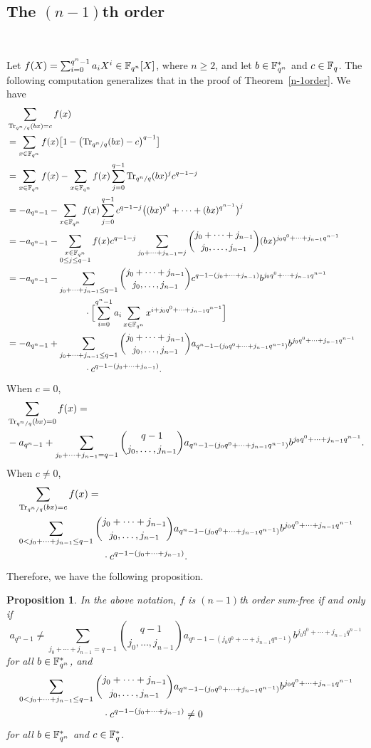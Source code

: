 \documentclass{amsart}
\newtheorem{prop}[thm]{Proposition}
\numberwithin{equation}{section}
\theoremstyle{definition}
\newcommand{\f}{\Bbb F}
\newcommand{\tr}{\text{\rm Tr}}
\begin{document}
\subsection{The $(n-1)$th order}\

Let $f(X)=\sum_{i=0}^{q^n-1}a_iX^i\in\f_{q^n}[X]$, where $n\ge 2$, and let $b\in\f_{q^n}^*$ and $c\in\f_q$. The following computation generalizes that in the proof of Theorem~\ref{n-1order}. We have
\begin{align*}
&\sum_{\tr_{q^n/q}(bx)=c}f(x)\cr
&=\sum_{x\in\f_{q^n}}f(x)\bigl[1-\bigl(\tr_{q^n/q}(bx)-c\bigr)^{q-1}\bigr]\cr
&=\sum_{x\in\f_{q^n}}f(x)-\sum_{x\in\f_{q^n}}f(x)\sum_{j=0}^{q-1}\tr_{q^n/q}(bx)^jc^{q-1-j}\cr
&=-a_{q^n-1}-\sum_{x\in\f_{q^n}}f(x)\sum_{j=0}^{q-1}c^{q-1-j}\bigl((bx)^{q^0}+\cdots+(bx)^{q^{n-1}}\bigr)^j\cr
&=-a_{q^n-1}-\sum_{\substack{x\in\f_{q^n}\cr 0\le j\le q-1}}f(x)c^{q-1-j}\sum_{j_0+\cdots+j_{n-1}=j}\binom{j_0+\cdots+j_{n-1}}{j_0,\dots,j_{n-1}}(bx)^{j_0q^0+\cdots+j_{n-1}q^{n-1}}\cr
&=-a_{q^n-1}-\sum_{j_0+\cdots+j_{n-1}\le q-1}\binom{j_0+\cdots+j_{n-1}}{j_0,\dots,j_{n-1}}c^{q-1-(j_0+\cdots+j_{n-1})}b^{j_0q^0+\cdots+j_{n-1}q^{n-1}}\cr
&\kern 3cm \cdot\Bigl[\sum_{i=0}^{q^n-1}a_i\sum_{x\in\f_{q^n}}x^{i+j_0q^0+\cdots+j_{n-1}q^{n-1}}\Bigr]\cr
&=-a_{q^n-1}+\sum_{j_0+\cdots+j_{n-1}\le q-1}\binom{j_0+\cdots+j_{n-1}}{j_0,\dots,j_{n-1}}a_{q^n-1-(j_0q^0+\cdots+j_{n-1}q^{n-1})}b^{j_0q^0+\cdots+j_{n-1}q^{n-1}}\cr
&\kern 3cm \cdot c^{q-1-(j_0+\cdots+j_{n-1})}.
\end{align*}
When $c=0$,
\begin{align}\label{c=0}
&\sum_{\tr_{q^n/q}(bx)=0}f(x)=\\
&-a_{q^n-1}+\sum_{j_0+\cdots+j_{n-1}=q-1}\binom{q-1}{j_0,\dots,j_{n-1}}a_{q^n-1-(j_0q^0+\cdots+j_{n-1}q^{n-1})}b^{j_0q^0+\cdots+j_{n-1}q^{n-1}}.\nonumber
\end{align}
When $c\ne 0$,
\begin{align}\label{cne0}
&\sum_{\tr_{q^n/q}(bx)=c}f(x)=\\
&\sum_{0<j_0+\cdots+j_{n-1}\le q-1}\binom{j_0+\cdots+j_{n-1}}{j_0,\dots,j_{n-1}}a_{q^n-1-(j_0q^0+\cdots+j_{n-1}q^{n-1})}b^{j_0q^0+\cdots+j_{n-1}q^{n-1}}\cr
&\kern 3cm \cdot c^{q-1-(j_0+\cdots+j_{n-1})}.\nonumber
\end{align}
Therefore, we have the following proposition.
\begin{prop}\label{P4.2}
In the above notation, $f$ is $(n-1)$th order sum-free if and only if 
\begin{equation}\label{cond1}
a_{q^n-1}\ne\sum_{j_0+\cdots+j_{n-1}=q-1}\binom{q-1}{j_0,\dots,j_{n-1}}a_{q^n-1-(j_0q^0+\cdots+j_{n-1}q^{n-1})}b^{j_0q^0+\cdots+j_{n-1}q^{n-1}}
\end{equation}
for all $b\in\f_{q^n}^*$, and 
\begin{align}\label{cond2}
&\sum_{0<j_0+\cdots+j_{n-1}\le q-1}\binom{j_0+\cdots+j_{n-1}}{j_0,\dots,j_{n-1}}a_{q^n-1-(j_0q^0+\cdots+j_{n-1}q^{n-1})}b^{j_0q^0+\cdots+j_{n-1}q^{n-1}}\\
&\kern 3cm \cdot c^{q-1-(j_0+\cdots+j_{n-1})}\ne 0\nonumber
\end{align}
for all $b\in\f_{q^n}^*$ and $c\in\f_q^*$.
\end{prop}
\end{document}
